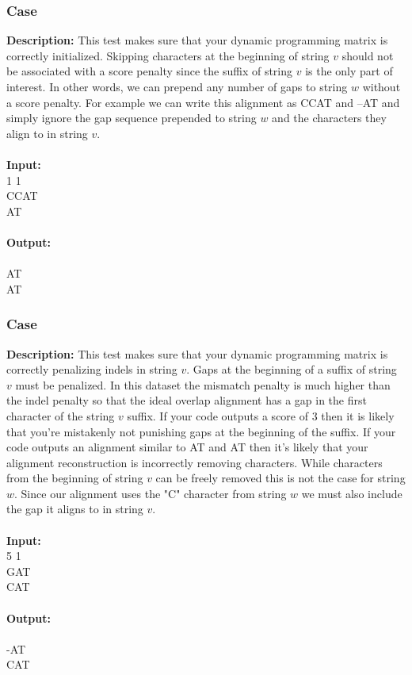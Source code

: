 \documentclass{article}
\newcommand{\code}[1]{{\fontfamily{pcr}\selectfont #1}}
\begin{document}
\subsubsection*{Case }
\hline \vspace{5}
\textbf{Description:} This test makes sure that your dynamic programming matrix is correctly initialized. Skipping characters at the beginning of string $v$ should not be associated with a score penalty since the suffix of string $v$ is the only part of interest. In other words, we can prepend any number of gaps to string $w$ without a score penalty. For example we can write this alignment as \code{CCAT} and \code{--AT} and simply ignore the gap sequence prepended to string $w$ and the characters they align to in string $v$.\\ \\
\noindent \textbf{Input:}\\
\code{1 1 1\\CCAT\\AT}\\ \\
\noindent \textbf{Output:}\\
\code{2\\AT\\AT}
\pagebreak

\subsubsection*{Case }
\hline \vspace{5}
\textbf{Description:} This test makes sure that your dynamic programming matrix is correctly penalizing indels in string $v$. Gaps at the beginning of a suffix of string $v$ must be penalized. In this dataset the mismatch penalty is much higher than the indel penalty so that the ideal overlap alignment has a gap in the first character of the string $v$ suffix. If your code outputs a score of $3$ then it is likely that you’re mistakenly not punishing gaps at the beginning of the suffix. If your code outputs an alignment similar to \code{AT} and \code{AT} then it’s likely that your alignment reconstruction is incorrectly removing characters. While characters from the beginning of string $v$ can be freely removed this is not the case for string $w$. Since our alignment uses the "C" character from string $w$ we must also include the gap it aligns to in string $v$.\\ \\
\noindent \textbf{Input:}\\
\code{1 5 1\\GAT\\CAT}\\ \\
\noindent \textbf{Output:}\\
\code{1\\-AT\\CAT}
\end{document}
